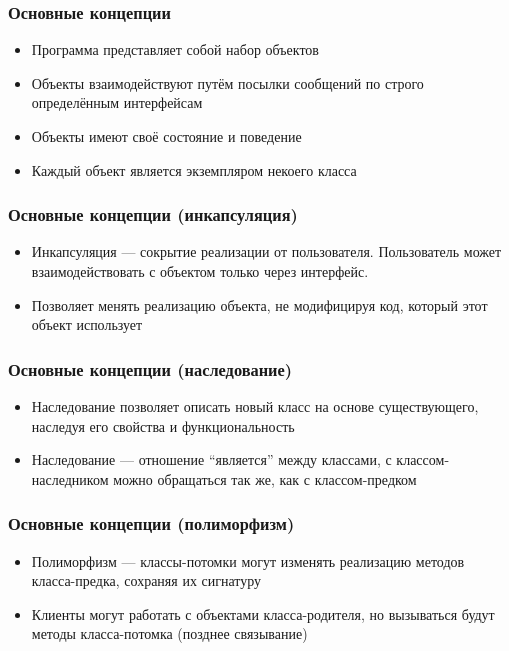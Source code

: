 \documentclass[xetex,mathserif,serif]{beamer}
\begin{document}
	\begin{frame}
		\frametitle{Основные концепции}
		\begin{itemize}
			\item Программа представляет собой набор объектов
			\item Объекты взаимодействуют путём посылки сообщений по строго определённым интерфейсам
			\item Объекты имеют своё состояние и поведение
			\item Каждый объект является экземпляром некоего класса
		\end{itemize}
	\end{frame}

	\begin{frame}
		\frametitle{Основные концепции (инкапсуляция)}
		\begin{itemize}
			\item Инкапсуляция --- сокрытие реализации от пользователя. Пользователь может взаимодействовать с объектом только через интерфейс.
			\item Позволяет менять реализацию объекта, не модифицируя код, который этот объект использует
		\end{itemize}
	\end{frame}

	\begin{frame}
		\frametitle{Основные концепции (наследование)}
		\begin{itemize}
			\item Наследование позволяет описать новый класс на основе существующего, наследуя его свойства и функциональность
			\item Наследование --- отношение ``является'' между классами, с классом-наследником можно обращаться так же, как с классом-предком
		\end{itemize}
	\end{frame}

	\begin{frame}
		\frametitle{Основные концепции (полиморфизм)}
		\begin{itemize}
			\item Полиморфизм --- классы-потомки могут изменять реализацию методов класса-предка, сохраняя их сигнатуру
			\item Клиенты могут работать с объектами класса-родителя, но вызываться будут методы класса-потомка (позднее связывание)
		\end{itemize}
	\end{frame}
\end{document}
